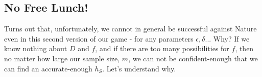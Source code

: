 {%


\subsection{No Free Lunch!}

Turns out that, unfortunately, we cannot in general be successful against Nature even in this second version of our game - for any parameters $\epsilon,\delta$...
Why? If we know nothing about $D$ and $f$, and if there are too many possibilities for $f$, then no matter how large our sample size, $m$, we can not be confident-enough that we can find an accurate-enough $h_S$. Let's understand why.
\vspace{5mm}

}
